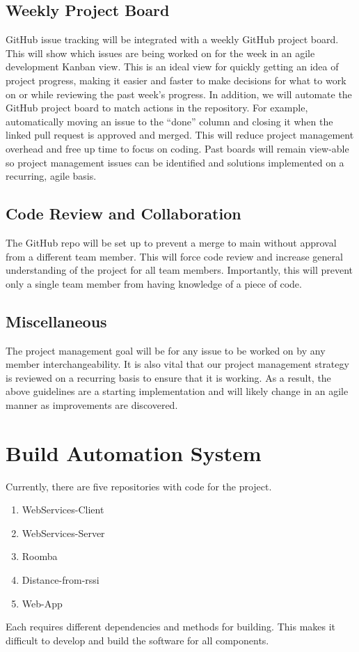 \documentclass[12pt]{report}
\begin{document}
\subsection{Weekly Project Board}
GitHub issue tracking will be integrated with a weekly GitHub project board. This will show which issues are being worked on for the week in an agile development Kanban view. This is an ideal view for quickly getting an idea of project progress, making it easier and faster to make decisions for what to work on or while reviewing the past week's progress. In addition, we will automate the GitHub project board to match actions in the repository. For example, automatically moving an issue to the “done” column and closing it when the linked pull request is approved and merged. This will reduce project management overhead and free up time to focus on coding. Past boards will remain view-able so project management issues can be identified and solutions implemented on a recurring, agile basis.
\subsection{Code Review and Collaboration}
The GitHub repo will be set up to prevent a merge to main without approval from a different team member. This will force code review and increase general understanding of the project for all team members. Importantly, this will prevent only a single team member from having knowledge of a piece of code.
\subsection{Miscellaneous}
The project management goal will be for any issue to be worked on by any member interchangeability. It is also vital that our project management strategy is reviewed on a recurring basis to ensure that it is working. As a result, the above guidelines are a starting implementation and will likely change in an agile manner as improvements are discovered.


\section{Build Automation System}

Currently, there are five repositories with code for the project.
\begin{enumerate}
\itemsep0em 
\item WebServices-Client
\item WebServices-Server
\item Roomba
\item Distance-from-rssi
\item Web-App
\end{enumerate}
Each requires different dependencies and methods for building. This makes it difficult to develop
and build the software for all components.
\end{document}
